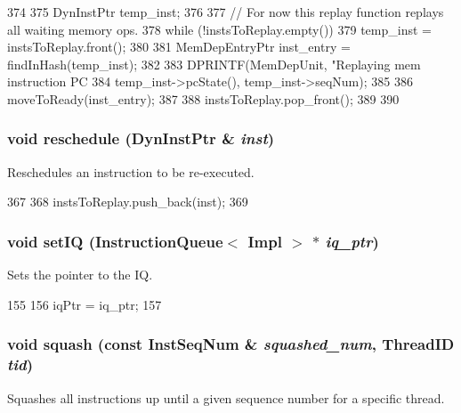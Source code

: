 \begin{DoxyCode}
374 {
375     DynInstPtr temp_inst;
376 
377     // For now this replay function replays all waiting memory ops.
378     while (!instsToReplay.empty()) {
379         temp_inst = instsToReplay.front();
380 
381         MemDepEntryPtr inst_entry = findInHash(temp_inst);
382 
383         DPRINTF(MemDepUnit, "Replaying mem instruction PC %
384                 temp_inst->pcState(), temp_inst->seqNum);
385 
386         moveToReady(inst_entry);
387 
388         instsToReplay.pop_front();
389     }
390 }
\end{DoxyCode}
\hypertarget{classMemDepUnit_a6a8d5eec636c2815cb1bc7ca3c467412}{
\subsubsection[{reschedule}]{\setlength{\rightskip}{0pt plus 5cm}void reschedule ({\bf DynInstPtr} \& {\em inst})}}
\label{classMemDepUnit_a6a8d5eec636c2815cb1bc7ca3c467412}
Reschedules an instruction to be re-\/executed. 


\begin{DoxyCode}
367 {
368     instsToReplay.push_back(inst);
369 }
\end{DoxyCode}
\hypertarget{classMemDepUnit_a9f2164f7d32d0906f0818ac724921840}{
\subsubsection[{setIQ}]{\setlength{\rightskip}{0pt plus 5cm}void setIQ ({\bf InstructionQueue}$<$ Impl $>$ $\ast$ {\em iq\_\-ptr})}}
\label{classMemDepUnit_a9f2164f7d32d0906f0818ac724921840}
Sets the pointer to the IQ. 


\begin{DoxyCode}
155 {
156     iqPtr = iq_ptr;
157 }
\end{DoxyCode}
\hypertarget{classMemDepUnit_a74283dfde2ab06c84e10bd85000c168b}{
\subsubsection[{squash}]{\setlength{\rightskip}{0pt plus 5cm}void squash (const {\bf InstSeqNum} \& {\em squashed\_\-num}, \/  {\bf ThreadID} {\em tid})}}
\label{classMemDepUnit_a74283dfde2ab06c84e10bd85000c168b}
Squashes all instructions up until a given sequence number for a specific thread. 


